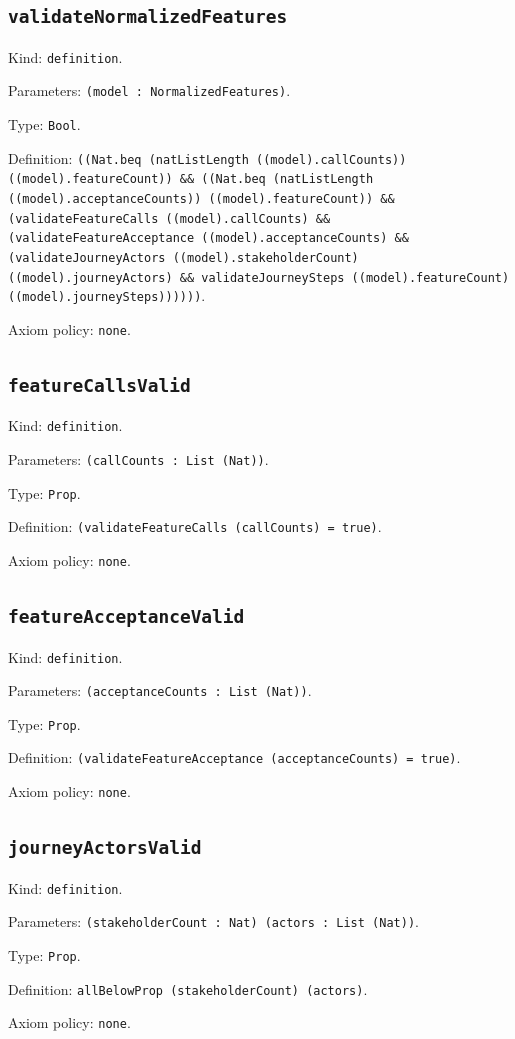 \documentclass[11pt]{article}
\begin{document}
\subsection*{\texttt{validateNormalizedFeatures}}
\noindent Kind: \texttt{definition}.\par
\noindent Parameters: \texttt{(model : NormalizedFeatures)}.\par
\noindent Type: \texttt{Bool}.\par
\noindent Definition: \texttt{((Nat.beq (natListLength ((model).callCounts)) ((model).featureCount)) \&\& ((Nat.beq (natListLength ((model).acceptanceCounts)) ((model).featureCount)) \&\& (validateFeatureCalls ((model).callCounts) \&\& (validateFeatureAcceptance ((model).acceptanceCounts) \&\& (validateJourneyActors ((model).stakeholderCount) ((model).journeyActors) \&\& validateJourneySteps ((model).featureCount) ((model).journeySteps))))))}.\par
\noindent Axiom policy: \texttt{none}.\par
\subsection*{\texttt{featureCallsValid}}
\noindent Kind: \texttt{definition}.\par
\noindent Parameters: \texttt{(callCounts : List (Nat))}.\par
\noindent Type: \texttt{Prop}.\par
\noindent Definition: \texttt{(validateFeatureCalls (callCounts) = true)}.\par
\noindent Axiom policy: \texttt{none}.\par
\subsection*{\texttt{featureAcceptanceValid}}
\noindent Kind: \texttt{definition}.\par
\noindent Parameters: \texttt{(acceptanceCounts : List (Nat))}.\par
\noindent Type: \texttt{Prop}.\par
\noindent Definition: \texttt{(validateFeatureAcceptance (acceptanceCounts) = true)}.\par
\noindent Axiom policy: \texttt{none}.\par
\subsection*{\texttt{journeyActorsValid}}
\noindent Kind: \texttt{definition}.\par
\noindent Parameters: \texttt{(stakeholderCount : Nat) (actors : List (Nat))}.\par
\noindent Type: \texttt{Prop}.\par
\noindent Definition: \texttt{allBelowProp (stakeholderCount) (actors)}.\par
\noindent Axiom policy: \texttt{none}.\par
\end{document}
